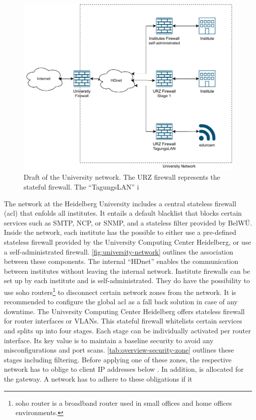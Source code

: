 \begin{figure}[ht]
    \centering
    \includegraphics[width=\textwidth]{figures/university-network.pdf}
    \caption[Draft of the University network]{Draft of the University network. The URZ firewall represents the stateful firewall. The \enquote{TagungsLAN} i}
    \label{fig:university-network}
\end{figure}

The network at the Heidelberg University includes a central stateless firewall (\ac{acl}) that enfolds all institutes.
It entails a default blacklist that blocks certain services such as SMTP, NCP, or SNMP, and a stateless filter provided by BelWÜ.
Inside the network, each institute has the possible to either use a pre-defined stateless firewall provided by the University Computing Center Heidelberg, or use a self-administrated firewall.
\autoref{fig:university-network} outlines the association between these components.
The internal \enquote{HDnet} enables the communication between institutes without leaving the internal network.
Institute firewalls can be set up by each institute and is self-administrated.
They do have the possibility to use \ac{soho} routers\footnote{\ac{soho} router is a broadband router used in small offices and home offices environments.} to disconnect certain network zones from the network.
It is recommended to configure the global \ac{acl} as a fall back solution in case of any downtime.
The University Computing Center Heidelberg offers stateless firewall for router interfaces or VLANs.
This stateful firewall whitelists certain services and splits up into four stages.
Each stage can be individually activated per router interface.
Its key value is to maintain a baseline security to avoid any misconfigurations and port scans.
\autoref{tab:overview-security-zone} outlines these stages including filtering.
Before applying one of these zones, the respective network has to oblige to client IP addresses below .
In addition,  is allocated for the gateway.
A network has to adhere to these obligations if it 

